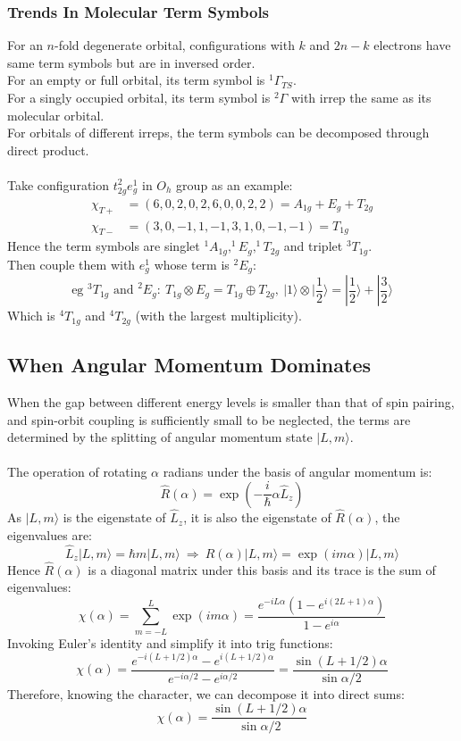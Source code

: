 	\subsubsection{Trends In Molecular Term Symbols}
	For an $n$-fold degenerate orbital, configurations with $k$ and $2n-k$ electrons have same term symbols but are in inversed order.\\
	For an empty or full orbital, its term symbol is $^1\Gamma_{TS}$.\\
	For a singly occupied orbital, its term symbol is $^2\Gamma$ with irrep the same as its molecular orbital.\\
	For orbitals of different irreps, the term symbols can be decomposed through direct product.\\\ \\
	Take configuration $t_{2g}^2e_g^1$ in $O_h$ group as an example:
	\[\begin{aligned}
	\chi_{T+} &= (6,0,2,0,2,6,0,0,2,2) = A_{1g} + E_{g} + T_{2g}\\
	\chi_{T-} &= (3,0,-1,1,-1,3,1,0,-1,-1) = T_{1g}
	\end{aligned}\]
	Hence the term symbols are singlet $^1A_{1g}, ^1E_{g}, ^1T_{2g}$ and triplet $^3T_{1g}$.\\
	Then couple them with $e_g^1$ whose term is $^2E_g$:
	\[\text{eg } ^3T_{1g} \text{ and } ^2E_g:\  T_{1g} \otimes E_g = T_{1g} \oplus T_{2g}, 
	\ |1\rangle \otimes |\frac{1}{2}\rangle = |\frac{1}{2}\rangle + |\frac{3}{2}\rangle\]
	Which is $^4T_{1g}$ and $^4T_{2g}$ (with the largest multiplicity).
	
	\subsection{When Angular Momentum Dominates}\label{double group}
	When the gap between different energy levels is smaller than that of spin pairing, 
	and spin-orbit coupling is sufficiently small to be neglected, 
	the terms are determined by the splitting of angular momentum state $|L,m\rangle$.\\\ \\
	The operation of rotating $\alpha$ radians under the basis of angular momentum is:
	\[\hat{R}(\alpha) = \exp(-\frac{i}{\hbar}\alpha\hat{L}_z)\]
	As $|L,m\rangle$ is the eigenstate of $\hat{L}_z$, it is also the eigenstate of $\hat{R}(\alpha)$, the eigenvalues are:
	\[\hat{L}_z|L,m\rangle = \hbar m|L,m\rangle\ \Rightarrow \ \hat{R}(\alpha)|L,m\rangle = \exp(im\alpha)|L,m\rangle\]
	Hence $\hat{R}(\alpha)$ is a diagonal matrix under this basis and its trace is the sum of eigenvalues:
	\[\chi(\alpha) = \sum_{m=-L}^{L}\exp(im\alpha) = \frac{e^{-iL\alpha}(1-e^{i(2L+1)\alpha})}{1-e^{i\alpha}}\]
	Invoking Euler's identity and simplify it into trig functions:
	\[\chi(\alpha) = \frac{e^{-i(L+1/2)\alpha}-e^{i(L+1/2)\alpha}}{e^{-i\alpha/2}-e^{i\alpha/2}} = \frac{\sin (L+1/2)\alpha}{\sin\alpha/2}\]
	Therefore, knowing the character, we can decompose it into direct sums:
	\[\boxed{\chi(\alpha) = \frac{\sin (L+1/2)\alpha}{\sin\alpha/2}}\]
	
